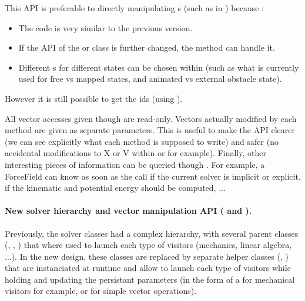 This API is preferable to directly manipulating s (such as in ) because :
\begin{itemize}
\item The code is very similar to the previous version.
\item If the API of the  or  class is further changed, the  method can handle it.
\item Different s for different states can be chosen within  (such as what is currently used for free vs mapped states, and animated vs external obstacle state).
\end{itemize}

However it is still possible to get the ids (using ).

All vector accesses given though  are read-only.
Vectors actually modified by each method are given as separate  parameters.
This is useful to make the API clearer (we can see explicitly what each method is supposed to write) and safer (no accidental modifications to X or V within  or  for example).
Finally, other interesting pieces of information can be queried though .
For example, a ForceField can know as soon as the  call if the current solver is implicit or explicit, if the kinematic and potential energy should be computed, ...

\paragraph{New solver hierarchy and vector manipulation API ( and ).}
Previously, the solver classes had a complex hierarchy, with several parent classes (, , ) that where used to launch each type of visitors (mechanics, linear algebra, ...).
In the new design, these classes are replaced by separate helper classes (, ) that are instanciated at runtime and allow to launch each type of visitors while holding and updating the persistant parameters (in the form of a  for mechanical visitors for example, or  for simple vector operations).


